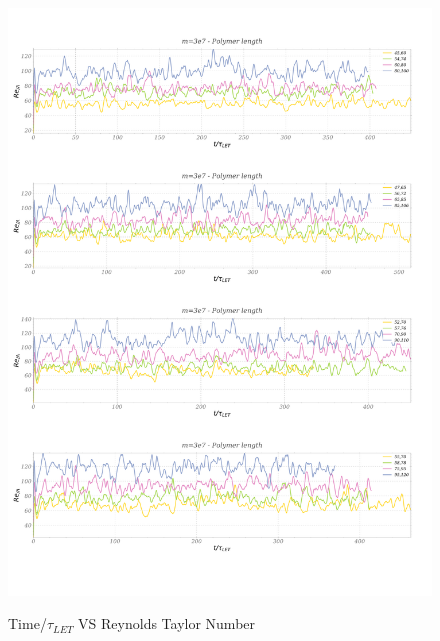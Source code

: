 \documentclass[]{article}
\begin{document}
\begin{figure}
   \centering
      \includegraphics[width=1\textwidth]{timeVSreynolds.pdf}
   \label{ReNum}
   \caption{Time/$\tau_{LET}$  VS Reynolds Taylor Number}
\end{figure}
\end{document}
